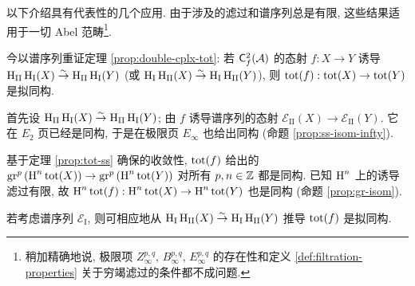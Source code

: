 以下介绍具有代表性的几个应用. 由于涉及的滤过和谱序列总是有限, 这些结果适用于一切 Abel 范畴\footnote{稍加精确地说, 极限项 $Z_\infty^{p,q}$, $B_\infty^{p,q}$, $E_\infty^{p,q}$ 的存在性和定义 \ref{def:filtration-properties} 关于穷竭滤过的条件都不成问题.}.

\begin{example}\label{eg:double-cplx-tot-ss}
	今以谱序列重证定理 \ref{prop:double-cplx-tot}: 若 $\mathsf{C}^2_f(\mathcal{A})$ 的态射 $f: X \to Y$ 诱导 $\operatorname{H}_{\mathrm{II}} \operatorname{H}_{\mathrm{I}}(X) \stackrel{\sim}{\rightarrow} \operatorname{H}_{\mathrm{II}}\operatorname{H}_{\mathrm{I}}(Y)$ (或 $\operatorname{H}_{\mathrm{I}} \operatorname{H}_{\mathrm{II}}(X) \stackrel{\sim}{\rightarrow} \operatorname{H}_{\mathrm{I}}\operatorname{H}_{\mathrm{II}}(Y)$), 则 $\operatorname{tot}(f): \operatorname{tot}(X) \to \operatorname{tot}(Y)$ 是拟同构.
	
	首先设 $\operatorname{H}_{\mathrm{II}} \operatorname{H}_{\mathrm{I}}(X) \stackrel{\sim}{\rightarrow} \operatorname{H}_{\mathrm{II}}\operatorname{H}_{\mathrm{I}}(Y)$; 由 $f$ 诱导谱序列的态射 $\mathscr{E}_{\mathrm{II}}(X) \to \mathscr{E}_{\mathrm{II}}(Y)$. 它在 $E_2$ 页已经是同构, 于是在极限页 $E_\infty$ 也给出同构 (命题 \ref{prop:ss-isom-infty}).

	基于定理 \ref{prop:tot-ss} 确保的收敛性, $\operatorname{tot}(f)$ 给出的 $\operatorname{gr}^p \left( \operatorname{H}^n \operatorname{tot}(X) \right) \to \operatorname{gr}^p\left( \operatorname{H}^n \operatorname{tot}(Y) \right)$ 对所有 $p, n \in \mathbb{Z}$ 都是同构. 已知 $\operatorname{H}^n$ 上的诱导滤过有限, 故 $\operatorname{H}^n \operatorname{tot}(f): \operatorname{H}^n \operatorname{tot}(X) \to \operatorname{H}^n \operatorname{tot}(Y)$ 也是同构 (命题 \ref{prop:gr-isom}).
	
	若考虑谱序列 $\mathscr{E}_{\mathrm{I}}$, 则可相应地从 $\operatorname{H}_{\mathrm{I}} \operatorname{H}_{\mathrm{II}}(X) \stackrel{\sim}{\rightarrow} \operatorname{H}_{\mathrm{I}}\operatorname{H}_{\mathrm{II}}(Y)$ 推导 $\operatorname{tot}(f)$ 是拟同构.
\end{example}

